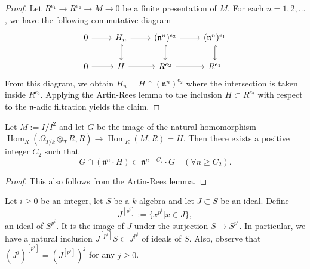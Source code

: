 \documentclass{amsart}
\newcommand{\Hom}{\operatorname{Hom}}
\begin{document}
\begin{proof}
    Let $R^{e_1}\to R^{e_2}\to M\to 0$ be
    a finite presentation of $M$. For each $n=1,2,\dots$, we have the following commutative diagram
\[\begin{tikzcd}
	0 & {H_n} & {(\mathfrak{n}^n)^{e_2}} & {(\mathfrak{n}^n)^{e_1}} \\
	0 & H & {R^{e_2}} & {R^{e_1}}
	\arrow[from=1-1, to=1-2]
	\arrow[from=1-2, to=1-3]
	\arrow[hook, from=1-2, to=2-2]
	\arrow[from=1-3, to=1-4]
	\arrow[hook, from=1-3, to=2-3]
	\arrow[hook, from=1-4, to=2-4]
	\arrow[from=2-1, to=2-2]
	\arrow[from=2-2, to=2-3]
	\arrow[from=2-3, to=2-4]
\end{tikzcd}\]
From this diagram, we obtain $H_n=H\cap (\mathfrak{n}^n)^{e_2}$ where the intersection is taken inside $R^{e_2}$. Applying the Artin-Rees lemma to the inclusion $H\subset R^{e_2}$ with respect to the $\mathfrak{n}$-adic filtration yields the claim.
\end{proof}

\begin{lemma}\label{G lem}
    Let $M:=I/I^2$ and let $G$ be the image of the natural homomorphism $\Hom_R(\Omega_{T/k}\otimes_TR,R)\to \Hom_R(M,R)=H$. Then there exists a positive integer $C_2$ such that $$G\cap (\mathfrak{n}^n\cdot H)\subset \mathfrak{n}^{n-C_2}\cdot G\quad (\forall n\ge C_2).$$
\end{lemma}
\begin{proof}
    This also follows from the Artin-Rees lemma.
\end{proof}

\begin{definition}
    Let $i\ge 0$ be an integer, let $S$ be a $k$-algebra and let $J\subset S$ be an ideal. Define $$J^{[p^i]}:=\{x^{p^i}|x\in J\},$$ an ideal of $S^{p^i}$. It is the image of $J$ under the surjection $S\to S^{p^i}$. In particular, we have a natural inclusion $J^{[p^i]}S\subset J^{p^i}$ of ideals of $S.$ Also, observe that $(J^j)^{[p^i]}=(J^{[p^i]})^j$ for any $j\ge 0$.
\end{definition}
\end{document}
